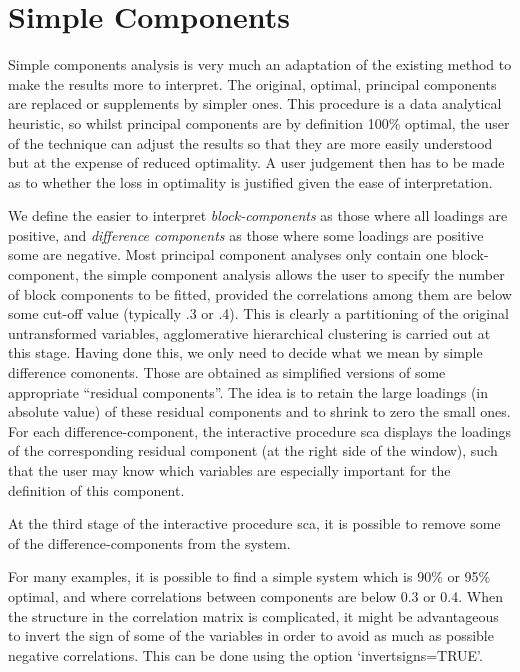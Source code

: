 \section{Simple Components}

Simple components analysis is very much an adaptation of the existing method to make the results more to interpret.  The original, optimal, principal components are replaced or supplements by simpler ones.
This procedure is a data analytical heuristic, so whilst principal components are by definition 100\% optimal, the user of the technique can adjust the results so that they are more easily understood but at the expense of reduced optimality.   A user judgement then has to be made as to whether the loss in optimality is justified given the ease of interpretation.   


We define the easier to interpret \emph{block-components} as those where all loadings are positive, and \emph{difference components} as those where some loadings are positive some are negative.   Most principal component analyses only contain one block-component, the simple component analysis allows the user to specify the number of block components to be fitted, provided the correlations among them are below some cut-off value (typically .3 or .4).   This is clearly a partitioning of the original untransformed variables, agglomerative hierarchical clustering is carried out at this stage.   Having done this, we only need to decide what we mean by simple difference comonents.   Those are obtained as simplified versions of some appropriate ``residual components''. The idea is to retain the large loadings (in absolute value) of these residual components and to shrink to zero the small ones. For each difference-component, the interactive procedure sca displays the loadings of the corresponding residual component (at the right side of the window), such that the user may know which variables are especially important for the definition of this component. 

At the third stage of the interactive procedure sca, it is possible to remove some of the difference-components from the system. 

For many examples, it is possible to find a simple system which is 90\% or 95\% optimal, and where correlations between components are below 0.3 or 0.4. When the structure in the correlation matrix is complicated, it might be advantageous to invert the sign of some of the variables in order to avoid as much as possible negative correlations. This can be done using the option `invertsigns=TRUE'. 

